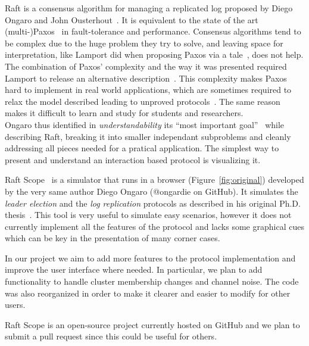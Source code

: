 Raft is a consensus algorithm for managing a replicated log
proposed by Diego Ongaro and John Ousterhout~\cite{ongaro2014search}.
It is equivalent to the state of the art (multi-)Paxos~\cite{lamport1998part} in fault-tolerance and performance.
Consensus algorithms tend to be complex due to the huge problem they try to solve,
and leaving space for interpretation, like Lamport
did when proposing Paxos via a tale~\cite{lamport1998part}, does not help.
The combination of Paxos' complexity and the way it was presented required
Lamport to release an alternative description~\cite{lamport2001paxos}.
This complexity makes Paxos hard to implement in real world applications, which are sometimes
required to relax the model described leading to unproved protocols~\cite{chandra2007paxos}.
The same reason makes it difficult to learn and study for students and researchers.\\

Ongaro thus identified in \emph{understandability} its ``most important goal''~\cite{ongaro2014consensus}
while describing Raft, breaking it into smaller independant subproblems and cleanly addressing all pieces needed
for a pratical application.
The simplest way to present and understand an interaction based
protocol is visualizing it.

Raft Scope~\cite{raftscope} is a simulator that runs in a browser (Figure~\ref{fig:original}) developed by the very same
author Diego Ongaro (@ongardie on GitHub).
It simulates the \emph{leader election} and the \emph{log replication}
protocols as described in his original Ph.D. thesis~\cite{ongaro2014consensus}.
This tool is very useful to simulate easy scenarios,
however it does not currently implement all the features of the protocol and lacks
some graphical cues which can be key in the presentation of many corner cases.

In our project we aim to add more features to the protocol implementation and improve the user interface where needed.
In particular, we plan to add functionality to handle cluster membership changes and channel noise.
 The code was also reorganized in order to make it clearer and easier to modify for other users.

Raft Scope is an open-source project currently hosted on GitHub and we plan to
submit a pull request since this could be useful for others.

\newpage
